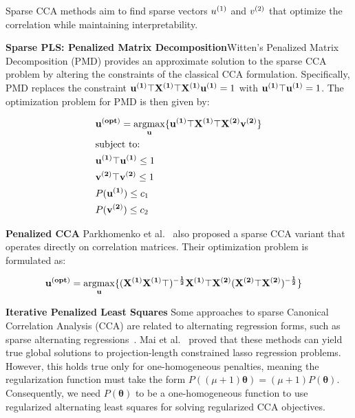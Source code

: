 Sparse CCA methods aim to find sparse vectors \(u^{(1)}\) and \(v^{(2)}\) that optimize the correlation while maintaining interpretability.

\textbf{Sparse PLS: Penalized Matrix Decomposition}Witten's Penalized Matrix Decomposition (PMD) \cite{
    witten2009penalized} provides an approximate solution to the sparse CCA problem by altering the constraints of the classical CCA formulation.
Specifically, PMD replaces the constraint \(\bold{u^{(1)}\top X^{(1)}\top X^{(1)} u^{(1)}}=1\) with \(\bold{u^{(1)}\top u^{(1)}}=1\).
The optimization problem for PMD is then given by:

\begin{align}
    \label{eq:pmd}
    & \bold{u^{(opt)}}=\underset{\bold{u}}{\mathrm{argmax}}\{ \bold{u^{(1)}\top X^{(1)}\top X^{(2)} v^{(2)}} \} \\
    & \text{subject to:} \notag \\
    & \bold{u^{(1)}\top u^{(1)}} \leq 1 \notag \\
    & \bold{v^{(2)}\top v^{(2)}} \leq 1 \notag \\
    & P(\bold{u^{(1)}}) \leq c_1 \notag \\
    & P(\bold{v^{(2)}}) \leq c_2 \notag
\end{align}

\textbf{Penalized CCA} Parkhomenko et al.\ \cite{parkhomenko2009sparse} also proposed a sparse CCA variant that
operates directly on correlation matrices.
Their optimization problem is formulated as:

\begin{align}
    \label{eq:parkho}
    & \bold{u^{(opt)}}=\underset{\bold{u}}{\mathrm{argmax}}\{ \bold{(X^{(1)}X^{(1)}\top)^{-\frac{1}{2}}X^{(1)}\top X^{(2)}(X^{(2)}\top X^{(2)})^{-\frac{1}{2}}} \}
\end{align}

\textbf{Iterative Penalized Least Squares} Some approaches to sparse Canonical Correlation Analysis (CCA) are related to alternating regression forms, such as sparse alternating regressions~\cite{wilms2015sparse}.
Mai et al.~\cite{mai2019iterative} proved that these methods can yield true global solutions to projection-length constrained lasso regression problems.
However, this holds true only for one-homogeneous penalties, meaning the regularization function must take the form \( P((\mu + 1)\boldsymbol{\theta}) = (\mu + 1)P(\boldsymbol{\theta}) \). Consequently, we need \( P(\boldsymbol{\theta}) \) to be a one-homogeneous function to use regularized alternating least squares for solving regularized CCA objectives.

